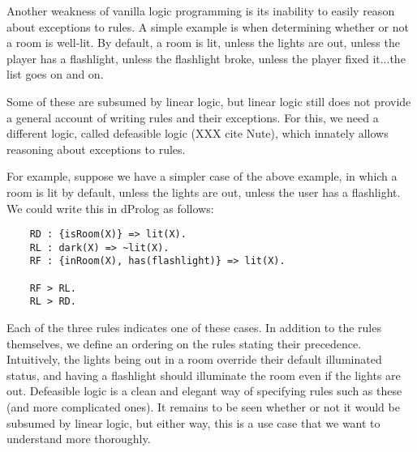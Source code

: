 Another weakness of vanilla logic programming is its inability to easily
reason about exceptions to rules. A simple example is when determining
whether or not a room is well-lit. By default, a room is lit, unless the
lights are out, unless the player has a flashlight, unless the flashlight
broke, unless the player fixed it...the list goes on and on.

Some of these are subsumed by linear logic, but linear logic still does not
provide a general account of writing rules and their exceptions. For this,
we need a different logic, called defeasible logic (XXX cite Nute), which
innately allows reasoning about exceptions to rules.

For example, suppose we have a simpler case of the above example, in which a
room is lit by default, unless the lights are out, unless the user has a
flashlight. We could write this in dProlog as follows:

\begin{verbatim}
    RD : {isRoom(X)} => lit(X).
    RL : dark(X) => ~lit(X).
    RF : {inRoom(X), has(flashlight)} => lit(X).
    
    RF > RL.
    RL > RD.
\end{verbatim}

Each of the three rules indicates one of these cases. In addition to the
rules themselves, we define an ordering on the rules stating their
precedence. Intuitively, the lights being out in a room override their
default illuminated status, and having a flashlight should illuminate the
room even if the lights are out. Defeasible logic is a clean and elegant way
of specifying rules such as these (and more complicated ones). It remains to
be seen whether or not it would be subsumed by linear logic, but either way,
this is a use case that we want to understand more thoroughly.
